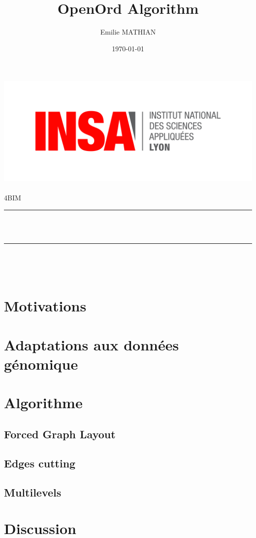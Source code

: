 \documentclass[12pt]{article}
\title{OpenOrd Algorithm }	%
\author{ Emilie MATHIAN}								%
\date{\today}		%
\makeatletter
\let\thetitle\@title
\let\theauthor\@author
\let\thedate\@date
\makeatother
\begin{document}
	
	\begin{titlepage}
		\centering
		\vspace*{0.5 cm}
        \includegraphics[scale=0.05]{insa.png}~\\[1cm]	
		\textsc{\Large 4BIM}\\[0.5 cm]				%
		\rule{\linewidth}{0.2 mm} \\[0.4 cm]
		{ \huge \bfseries \thetitle}\\
		\rule{\linewidth}{0.2 mm} \\[1.5 cm]
		
		\theauthor
		
		{\thedate}\\[2 cm]
		
		\vfill
		
		
		
	\end{titlepage}
	\pagebreak
	\pagebreak
	
	\tableofcontents
	
	\pagebreak
	
\section{Motivations}
\section{Adaptations aux données génomique}
\section{Algorithme}
\subsection{Forced Graph Layout}
\subsection{Edges cutting}
\subsection{Multilevels}
\section{Discussion}
\end{document}
